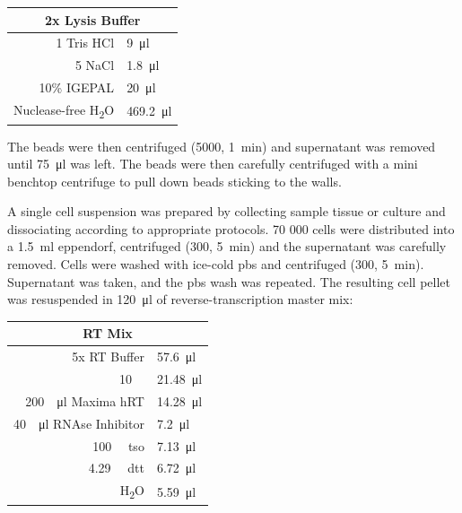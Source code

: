\begin{appendix}
\begin{multicols}{2}
\begin{center}
\begin{tabular}{r|l}
	\multicolumn{2}{c}{2x Lysis Buffer} \\
	\hline
	\SI{1}{\molar} Tris HCl  & \SI{9}{\ul} \\
	\SI{5}{\molar} NaCl & \SI{1.8}{\ul} \\
	10\% IGEPAL & \SI{20}{\ul} \\
	Nuclease-free H\textsubscript{2}O & \SI{469.2}{\ul} \\
\end{tabular}
\end{center}
\medskip

The beads were then centrifuged (\SI{5000}{\rcf}, \SI{1}{\minute}) and supernatant was removed until \SI{75}{\ul} was left. The beads were then carefully centrifuged with a mini benchtop centrifuge to pull down beads sticking to the walls.\pms

A single cell suspension was prepared by collecting sample tissue or culture and dissociating according to appropriate protocols. 70 000 cells were distributed into a \SI{1.5}{\ml} eppendorf, centrifuged (\SI{300}{\rcf}, \SI{5}{\minute}) and the supernatant was carefully removed. Cells were washed with ice-cold \acrshort{pbs} and centrifuged (\SI{300}{\rcf}, \SI{5}{\minute}). Supernatant was taken, and the \acrshort{pbs} wash was repeated. The resulting cell pellet was resuspended in \SI{120}{\ul} of reverse-transcription master mix:\pms

\begin{center}
\begin{tabular}{r|l}
	\multicolumn{2}{c}{RT Mix} \\
	\hline
	5x RT Buffer & \SI{57.6}{\ul} \\
	\SI{10}{\micro\molar} \acrshortpl{dntp} & \SI{21.48}{\ul} \\
	\SI{200}{\unit\per\ul} Maxima hRT & \SI{14.28}{\ul} \\
	\SI{40}{\unit\per\ul} RNAse Inhibitor & \SI{7.2}{\ul} \\
	\SI{100}{\micro\molar} \acrshort{tso} & \SI{7.13}{\ul} \\
	\SI{4.29}{\micro\molar} \acrshort{dtt} & \SI{6.72}{\ul} \\
	H\textsubscript{2}O & \SI{5.59}{\ul} \\
\end{tabular}
\end{center}
\medskip



\end{multicols}
\end{appendix}
